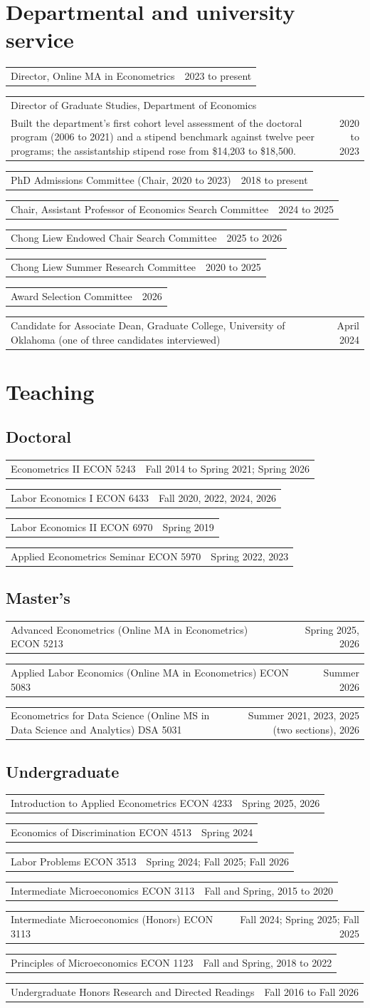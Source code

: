 \documentclass[10.5pt]{article}
\makeatletter
\newcommand{\cvrow}[2]{\noindent\begin{tabularx}{\textwidth}{@{}X r@{}} #1 & {\small\color{gray} #2} \end{tabularx}\par}
\makeatother
\begin{document}
\section{Departmental and university service}
\cvrow{Director, Online MA in Econometrics}{2023 to present}
\cvrow{Director of Graduate Studies, Department of Economics\\ {\small Built the department's first cohort level assessment of the doctoral program (2006 to 2021) and a stipend benchmark against twelve peer programs; the assistantship stipend rose from \$14,203 to \$18,500.}}{2020 to 2023}
\cvrow{PhD Admissions Committee (Chair, 2020 to 2023)}{2018 to present}
\cvrow{Chair, Assistant Professor of Economics Search Committee}{2024 to 2025}
\cvrow{Chong Liew Endowed Chair Search Committee}{2025 to 2026}
\cvrow{Chong Liew Summer Research Committee}{2020 to 2025}
\cvrow{Award Selection Committee}{2026}
\cvrow{Candidate for Associate Dean, Graduate College, University of Oklahoma (one of three candidates interviewed)}{April 2024}
\section{Teaching}
\subsection{Doctoral}
\cvrow{Econometrics II {\small\color{gray} ECON 5243}}{Fall 2014 to Spring 2021; Spring 2026}
\cvrow{Labor Economics I {\small\color{gray} ECON 6433}}{Fall 2020, 2022, 2024, 2026}
\cvrow{Labor Economics II {\small\color{gray} ECON 6970}}{Spring 2019}
\cvrow{Applied Econometrics Seminar {\small\color{gray} ECON 5970}}{Spring 2022, 2023}
\subsection{Master's}
\cvrow{Advanced Econometrics (Online MA in Econometrics) {\small\color{gray} ECON 5213}}{Spring 2025, 2026}
\cvrow{Applied Labor Economics (Online MA in Econometrics) {\small\color{gray} ECON 5083}}{Summer 2026}
\cvrow{Econometrics for Data Science (Online MS in Data Science and Analytics) {\small\color{gray} DSA 5031}}{Summer 2021, 2023, 2025 (two sections), 2026}
\subsection{Undergraduate}
\cvrow{Introduction to Applied Econometrics {\small\color{gray} ECON 4233}}{Spring 2025, 2026}
\cvrow{Economics of Discrimination {\small\color{gray} ECON 4513}}{Spring 2024}
\cvrow{Labor Problems {\small\color{gray} ECON 3513}}{Spring 2024; Fall 2025; Fall 2026}
\cvrow{Intermediate Microeconomics {\small\color{gray} ECON 3113}}{Fall and Spring, 2015 to 2020}
\cvrow{Intermediate Microeconomics (Honors) {\small\color{gray} ECON 3113}}{Fall 2024; Spring 2025; Fall 2025}
\cvrow{Principles of Microeconomics {\small\color{gray} ECON 1123}}{Fall and Spring, 2018 to 2022}
\cvrow{Undergraduate Honors Research and Directed Readings {\small\color{gray} }}{Fall 2016 to Fall 2026}
\end{document}

